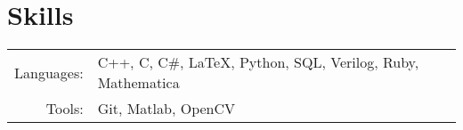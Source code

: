 \documentclass[a4paper,10pt]{article} %
\begin{document}

\section{Skills}

\begin{tabular}{rl}
Languages: & C++, C, C\#, \LaTeX, Python, SQL, Verilog, Ruby, Mathematica \\
Tools: & Git, Matlab, OpenCV
\end{tabular}

\clearpage %
\end{document}
